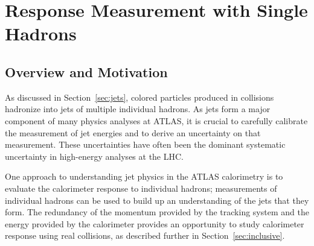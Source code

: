 \chapter{Response Measurement with Single Hadrons}

\newcommand*{\pL}{\ensuremath{\Lambda}\xspace}
\newcommand*{\pLB}{\ensuremath{\bar{\Lambda}}\xspace}
\newcommand*{\pKS}{\ensuremath{K_\text{S}^{0}}\xspace}
\newcommand*{\pKL}{\ensuremath{K_L}\xspace}
\newcommand*{\pP}{\ensuremath{p}\xspace}
\newcommand*{\pAP}{\ensuremath{\bar{p}}\xspace}
\newcommand*{\pip}{\ensuremath{\pi^+}\xspace}
\newcommand*{\pim}{\ensuremath{\pi^-}\xspace}
\newcommand*{\piz}{\ensuremath{\pi^0}\xspace}
\newcommand*{\ep}{\ensuremath{E/p}\xspace}
\newcommand*{\epav}{\ensuremath{\langle E/p \rangle}\xspace}
\newcommand*{\epcor}{\ensuremath{\langle E/p \rangle_{\mathrm{COR}}}\xspace}
\newcommand*{\epbg}{\ensuremath{\langle E/p \rangle_{\mathrm{BG}}}\xspace}
\newcommand*{\Ea}{\ensuremath{E_a}\xspace}
\newcommand*{\QGSP}{\texttt{QGSP\_BERT}\xspace}
\newcommand*{\FTFP}{\texttt{FTFP\_BERT}\xspace}


\label{ch:singlehadrons}

\section{Overview and Motivation}

As discussed in Section~\ref{sec:jets}, colored particles produced in collisions hadronize into jets of multiple individual hadrons.
As jets form a major component of many physics analyses at ATLAS, it is crucial to carefully calibrate the measurement of jet energies and to derive an uncertainty on that measurement.
These uncertainties have often been the dominant systematic uncertainty in high-energy analyses at the LHC.

One approach to understanding jet physics in the ATLAS calorimetry is to evaluate the calorimeter response to individual hadrons; measurements of individual hadrons can be used to build up an understanding of the jets that they form.
The redundancy of the momentum provided by the tracking system and the energy provided by the calorimeter provides an opportunity to study calorimeter response using real collisions, as described further in Section~\ref{sec:inclusive}.


